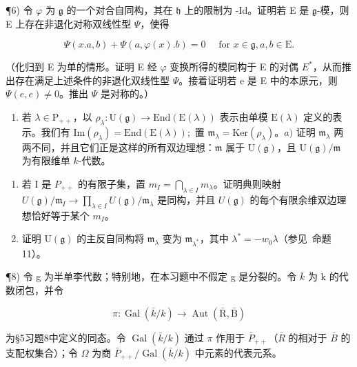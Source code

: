 ¶6) 令 \(\varphi\) 为 \(\mathfrak{g}\) 的一个对合自同构，其在 \(\mathfrak{h}\) 上的限制为 -Id。证明若 E 是 \(\mathfrak{g}\)-模，则 E 上存在非退化对称双线性型 \(\varPsi\)，使得

\[
\varPsi (x. a, b) + \varPsi (a, \varphi (x). b) = 0 \quad \text {   for   } x \in \mathfrak {g}, a, b \in \mathrm{E}.
\]

（化归到 E 为单的情形。证明 E 经 \(\varphi\) 变换所得的模同构于 E 的对偶 \(E^{*}\)，从而推出存在满足上述条件的非退化双线性型 \(\Psi\)。接着证明若 e 是 E 中的本原元，则 \(\Psi(e,e)\neq0\)。推出 \(\Psi\) 是对称的。）

\begin{enumerate}
\def\labelenumi{\arabic{enumi})}
\setcounter{enumi}{6}
\tightlist
\item
  若 \(\lambda \in \mathrm{P}_{++}\)，以 \(\rho_{\lambda}:\mathrm{U}(\mathfrak{g})\to \mathrm{End}(\mathrm{E}(\lambda))\) 表示由单模 \(\mathrm{E}(\lambda)\) 定义的表示。我们有 \(\mathrm{Im}(\rho_{\lambda}) = \mathrm{End}(\mathrm{E}(\lambda));\) 置 \(\mathfrak{m}_{\lambda} = \mathrm{Ker}(\rho_{\lambda})\)。\(a)\) 证明 \(\mathfrak{m}_{\lambda}\) 两两不同，并且它们正是这样的所有双边理想：\(\mathfrak{m}\) 属于 \(\mathrm{U}(\mathfrak{g})\)，且 \(\mathrm{U}(\mathfrak{g}) / \mathfrak{m}\) 为有限维单 \(k\)-代数。
\end{enumerate}

\begin{enumerate}
\def\labelenumi{\alph{enumi})}
\setcounter{enumi}{1}
\item
  若 I 是 \(P_{++}\) 的有限子集，置 \(m_{I} = \bigcap_{\lambda \in I} m_{\lambda}\)。证明典则映射 \(U(\mathfrak{g}) / \mathfrak{m}_{I} \to \prod_{\lambda \in I} U(\mathfrak{g}) / \mathfrak{m}_{\lambda}\) 是同构，并且 \(U(\mathfrak{g})\) 的每个有限余维双边理想恰好等于某个 \(m_{I}\)。
\item
  证明 \(\mathrm{U}(\mathfrak{g})\) 的主反自同构将 \(\mathfrak{m}_{\lambda}\) 变为 \(\mathfrak{m}_{\lambda^*}\)，其中 \(\lambda^{*} = -w_{0}\lambda\)（参见~命题11）。
\end{enumerate}

¶8) 令 g 为半单李代数；特别地，在本习题中不假定 g 是分裂的。令 \(\bar{k}\) 为 k 的代数闭包，并令

\[
\pi : \operatorname{Gal} (\bar {k} / k) \to \operatorname{Aut} (\bar {\mathrm{R}}, \bar {\mathrm{B}})
\]

为§5习题8中定义的同态。令 \(\operatorname{Gal}(\bar{k}/k)\) 通过 \(\pi\) 作用于 \(\bar{P}_{++}\)（\(\bar{R}\) 的相对于 \(\bar{B}\) 的支配权集合）；令 \(\Omega\) 为商 \(\bar{P}_{++}/\operatorname{Gal}(\bar{k}/k)\) 中元素的代表元系。

